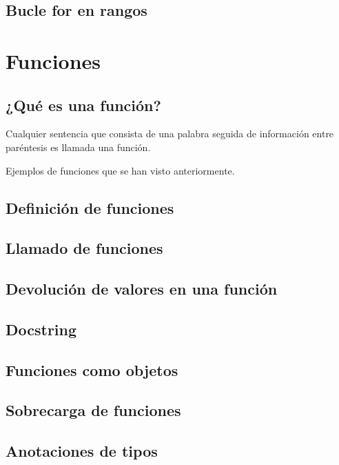 \documentclass{report}
\begin{document}
\section{Bucle for en rangos}

\clearpage\chapter{Funciones}

\section{¿Qué es una función?}

Cualquier sentencia que consista de una palabra seguida de información entre paréntesis es llamada una función.

Ejemplos de funciones que se han visto anteriormente.


\section{Definición de funciones}

\section{Llamado de funciones}

\section{Devolución de valores en una función}

\section{Docstring}

\section{Funciones como objetos}

\section{Sobrecarga de funciones}

\section{Anotaciones de tipos}
\end{document}
